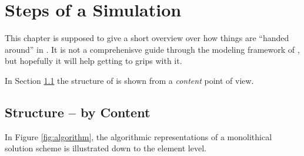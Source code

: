 
\section{Steps of a \Dumux Simulation}
\label{flow}


This chapter is supposed to give a short overview over how things are ``handed around'' in \Dumux. It
is not a comprehenisve guide through the modeling framework of \Dumux, but
hopefully it will help getting to grips with it.

In Section \ref{content} the structure of \Dumux is shown from a \emph{content}
point of view.

\subsection{Structure -- by Content}

\label{content}
In Figure \ref{fig:algorithm}, the algorithmic representations of a monolithical
solution scheme is illustrated down to the element level.


